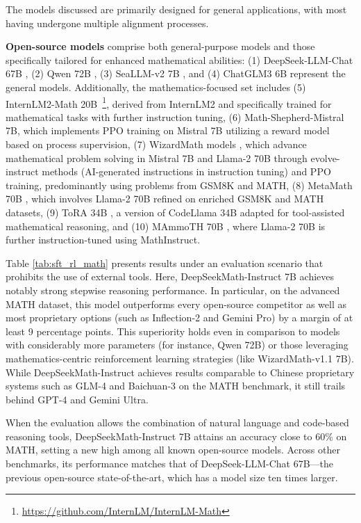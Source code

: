 The models discussed are primarily designed for general applications, with most having undergone multiple alignment processes.

\item \textbf{Open-source models} comprise both general-purpose models and those specifically tailored for enhanced mathematical abilities: (1) DeepSeek-LLM-Chat 67B \citep{deepseek-llm}, (2) Qwen 72B \citep{qwen}, (3) SeaLLM-v2 7B \citep{seallm}, and (4) ChatGLM3 6B \citep{chatglm3} represent the general models. Additionally, the mathematics-focused set includes (5) InternLM2-Math 20B~\footnote{\url{https://github.com/InternLM/InternLM-Math}}, derived from InternLM2 and specifically trained for mathematical tasks with further instruction tuning, (6) Math-Shepherd-Mistral 7B, which implements PPO training \citep{schulman2017proximal} on Mistral 7B \citep{mistral} utilizing a reward model based on process supervision, (7) WizardMath models \citep{wizardmath}, which advance mathematical problem solving in Mistral 7B and Llama-2 70B \citep{llama2} through evolve-instruct methods (AI-generated instructions in instruction tuning) and PPO training, predominantly using problems from GSM8K and MATH, (8) MetaMath 70B \citep{metamath}, which involves Llama-2 70B refined on enriched GSM8K and MATH datasets, (9) ToRA 34B \cite{tora}, a version of CodeLlama 34B adapted for tool-assisted mathematical reasoning, and (10) MAmmoTH 70B \citep{MathInstruct}, where Llama-2 70B is further instruction-tuned using MathInstruct.

Table \ref{tab:sft_rl_math} presents results under an evaluation scenario that prohibits the use of external tools. Here, DeepSeekMath-Instruct 7B achieves notably strong stepwise reasoning performance. In particular, on the advanced MATH dataset, this model outperforms every open-source competitor as well as most proprietary options (such as Inflection-2 and Gemini Pro) by a margin of at least 9 percentage points. This superiority holds even in comparison to models with considerably more parameters (for instance, Qwen 72B) or those leveraging mathematics-centric reinforcement learning strategies (like WizardMath-v1.1 7B). While DeepSeekMath-Instruct achieves results comparable to Chinese proprietary systems such as GLM-4 and Baichuan-3 on the MATH benchmark, it still trails behind GPT-4 and Gemini Ultra.

When the evaluation allows the combination of natural language and code-based reasoning tools, DeepSeekMath-Instruct 7B attains an accuracy close to 60\% on MATH, setting a new high among all known open-source models. Across other benchmarks, its performance matches that of DeepSeek-LLM-Chat 67B—the previous open-source state-of-the-art, which has a model size ten times larger.

